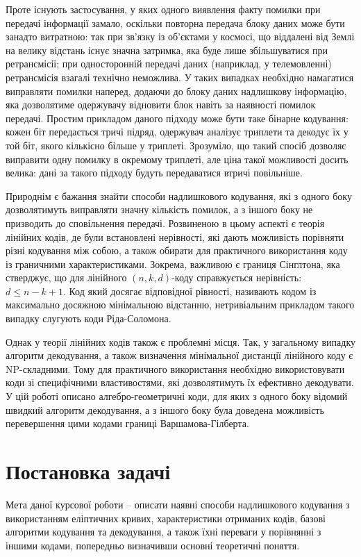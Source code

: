 \documentclass[a4paper,12pt,oneside]{article}
\begin{document}
Проте існують застосування, у яких одного виявлення факту помилки при передачі інформації замало, оскільки повторна передача блоку даних може бути занадто витратною: 
так при зв'язку із об'єктами у космосі, що віддалені від Землі на велику відстань існує значна затримка, яка буде лише збільшуватися при ретрансмісії; 
при односторонній передачі даних (наприклад, у телемовленні) ретрансмісія взагалі технічно неможлива. 
У таких випадках необхідно намагатися виправляти помилки наперед, додаючи до блоку даних надлишкову інформацію, яка дозволятиме одержувачу відновити блок навіть за наявності помилок передачі. 
Простим прикладом даного підходу може бути таке бінарне кодування: кожен біт передається тричі підряд, одержувач аналізує триплети та декодує їх у той біт, якого кількісно більше у триплеті. 
Зрозуміло, що такий спосіб дозволяє виправити одну помилку в окремому триплеті, але ціна такої можливості досить велика: дані за такого підходу будуть передаватися втричі повільніше.

Природнім є бажання знайти способи надлишкового кодування, які з одного боку дозволятимуть виправляти значну кількість помилок, а з іншого боку не призводить до сповільнення передачі. 
Розвиненою в цьому аспекті є теорія лінійних кодів, де були встановлені нерівності, які дають можливість порівняти різні кодування між собою, 
а також обирати для практичного використання коду із граничними характеристиками. 
Зокрема, важливою є границя Сінглтона, яка стверджує, що для лінійного $(n, k, d)$-коду справжується нерівність: $d \le n-k+1$. 
Код який досягає відповідної рівності, називають кодом із максимально досяжною мінімальною відстанню, нетривіальним прикладом такого випадку слугують коди Ріда-Соломона.

Однак у теорії лінійних кодів також є проблемні місця. Так, у загальному випадку алгоритм декодування, а також визначення мінімальної дистанції лінійного коду є NP-складними. 
Тому для практичного використання необхідно використовувати коди зі специфічними властивостями, які дозволятимуть їх ефективно декодувати. 
У цій роботі описано алгебро-геометричні коди, для яких з одного боку відомий швидкий алгоритм декодування, 
а з іншого боку була доведена можливість перевершення цими кодами границі Варшамова-Гілберта.

\section{Постановка задачі}
Мета даної курсової роботи -- описати наявні способи надлишкового кодування з використанням еліптичних кривих, характеристики отриманих кодів,
базові алгоритми кодування та декодування, а також їхні переваги у порівнянні з іншими кодами, попередньо визначивши основні теоретичні поняття.
\end{document}
